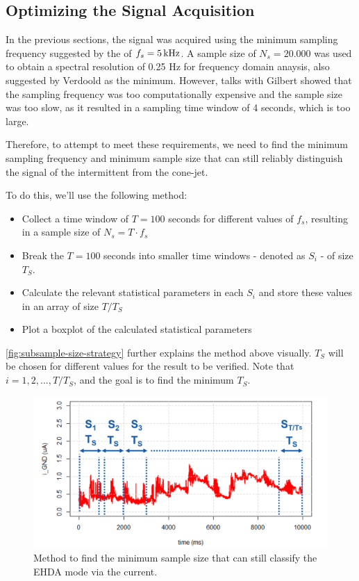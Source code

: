 \documentclass[oneside,12pt]{article}
\begin{document}
\subsection{Optimizing the Signal Acquisition}

In the previous sections, the signal was acquired using the minimum sampling frequency
suggested by the \cite{Verdoold2013} of $f_s = 5 \,\mathrm{kHz}$. A sample size of $N_s = 20.000$ was used to obtain a spectral resolution of 0.25 Hz
for frequency domain anaysis, also suggested by Verdoold as the minimum. However, talks with Gilbert showed that the sampling frequency was too
computationally expensive and the sample size was too slow, as it resulted in a sampling time window of 4 seconds, which is too large.

Therefore, to attempt to meet these requirements, we need to find the minimum sampling frequency and
minimum sample size that can still reliably distinguish the signal of the intermittent from the cone-jet.

To do this, we'll use the following method:

\begin{itemize}
    \item Collect a time window of $T = 100$ seconds for different values of $f_s$, resulting in a sample size of $N_s = T \cdot f_s$
    \item Break the $T = 100$ seconds into smaller time windows - denoted as $S_i$ - of size $T_S$. 
    \item Calculate the relevant statistical parameters in each $S_i$ and store these values in an array of size $T / T_S$
    \item Plot a boxplot of the calculated statistical parameters
\end{itemize}

\autoref{fig:subsample-size-strategy} further explains the method above visually. $T_S$ will be chosen for different values for the result to be verified. 
Note that $i = 1, 2, ..., T / T_S$, and the goal is to find the minimum $T_S$.

\begin{figure}[h!]
    \centering
    \includegraphics[width=.8\textwidth,trim=1 1 1 1,clip]{figures/subsample-size-strategy.png}
    \caption{Method to find the minimum sample size that can still classify the EHDA mode via the current.}
    \label{fig:subsample-size-strategy}
\end{figure}
\end{document}

